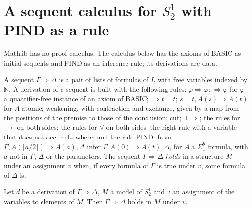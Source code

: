 \section{A sequent calculus for $S^1_2$ with PIND as a rule}
\label{sec:arithmetic-sequents}

Mathlib has no proof calculus. The calculus below has the axioms of BASIC as initial sequents and
PIND as an inference rule; its derivations are data.

\begin{definition}
  \label{def:arithmetic-deriva}
  \leanok
  \own{}
  \infrastructure{}
  A sequent $\Gamma \Rightarrow \Delta$ is a pair of lists of formulas of $L$ with free variables
  indexed by $\mathbb{N}$. A derivation of a sequent is built with the following rules:
  $\varphi \Rightarrow \varphi$; $\Rightarrow \varphi$ for $\varphi$ a quantifier-free instance of an
  axiom of BASIC; $\Rightarrow t = t$; $s = t, A(s) \Rightarrow A(t)$ for $A$ atomic; weakening,
  with contraction and exchange, given by a map from the positions of the premise to those of the
  conclusion; cut; $\bot \Rightarrow$; the rules for $\to$ on both sides; the rules for $\forall$ on
  both sides, the right rule with a variable that does not occur elsewhere; and the rule PIND: from
  $\Gamma, A(\lfloor a/2 \rfloor) \Rightarrow A(a), \Delta$ infer $\Gamma, A(0) \Rightarrow A(t),
  \Delta$, for $A$ a $\Sigma^b_1$ formula, with $a$ not in $\Gamma$, $\Delta$ or the parameters. The
  sequent $\Gamma \Rightarrow \Delta$ \emph{holds} in a structure $M$ under an assignment $v$ when,
  if every formula of $\Gamma$ is true under $v$, some formula of $\Delta$ is.
\end{definition}

\begin{theorem}
  \label{thm:arithmetic-deriva-correcta}
  \leanok
  Let $d$ be a derivation of $\Gamma \Rightarrow \Delta$, $M$ a model of $S^1_2$ and $v$ an
  assignment of the variables to elements of $M$. Then $\Gamma \Rightarrow \Delta$ holds in $M$
  under $v$.
\end{theorem}

